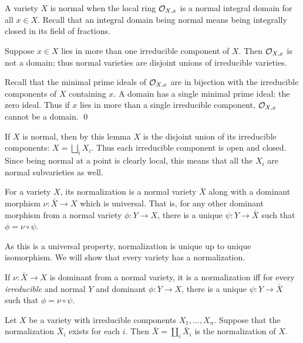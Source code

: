 \bdefn

    A variety $X$ is {\emphcolor normal} when the local ring ${{\cal O}}_{X,x}$ is a normal integral domain for all $x\in X$.
    Recall that an integral domain being normal means being integrally closed in its field of fractions.

\edefn

\blemm

    Suppose $x\in X$ lies in more than one irreducible component of $X$.
    Then ${{\cal O}}_{X,x}$ is not a domain; thus normal varieties are disjoint unions of irreducible varieties.

\elemm

\bproof

    Recall that the minimal prime ideals of ${{\cal O}}_{X,x}$ are in bijection with the irreducible components of $X$ containing $x$.
    A domain has a single minimal prime ideal: the zero ideal.
    Thus if $x$ lies in more than a single irreducible component, ${{\cal O}}_{X,x}$ cannot be a domain.
    \qed

\eproof

If $X$ is normal, then by this lemma $X$ is the disjoint union of its irreducible components: $X=\bigsqcup_iX_i$.
Thus each irreducible component is open and closed.
Since being normal at a point is clearly local, this means that all the $X_i$ are normal subvarieties as well.

\bdefn

    For a variety $X$, its {\emphcolor normalization} is a normal variety $\bar X$ along with a dominant morphism $\nu\colon\bar X\to X$ which is universal.
    That is, for any other dominant morphism from a normal variety $\phi\colon Y\to X$, there is a unique $\psi\colon Y\to\bar X$ such that $\phi=\nu\circ\psi$.

\edefn

As this is a universal property, normalization is unique up to unique isomorphism.
We will show that every variety has a normalization.

\blemm

    \benum
        \item If $\nu\colon\bar X\to X$ is dominant from a normal variety, it is a normalization iff for every {\it irreducible\/} and normal $Y$ and dominant $\phi\colon Y\to X$,
        there is a unique $\psi\colon Y\to\bar X$ such that $\phi=\nu\circ\psi$.

        \item Let $X$ be a variety with irreducible components $X_1,\dots,X_n$.
        Suppose that the normalization $\bar X_i$ exists for each $i$.
        Then $\bar X=\coprod_i\bar X_i$ is the normalization of $X$.
    \eenum

